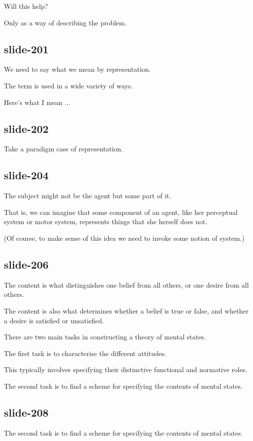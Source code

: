 \documentclass[12pt,\papersize]{extarticle}
\begin{document}
Will this help?
 
Only as a way of describing the problem.
 
\subsection{slide-201}
We need to say what we mean by representation.
 
The term is used in a wide variety of ways.
 
Here's what I mean ...
 
\subsection{slide-202}
Take a paradigm case of representation.
 
\subsection{slide-204}
The subject might not be the agent but some part of it.
 
That is, we can imagine that some component of an agent, like her perceptual system or motor system, represents things that she herself does not.
 
(Of course, to make sense of this idea we need to invoke some notion of system.)
 
\subsection{slide-206}
The content is what distinguishes one belief from all others, or one desire from all others.
 
The content is also what determines whether a belief is true or false, and whether a desire is satisfied or unsatisfied.
 
There are two main tasks in constructing a theory of mental states.
 
The first task is to characterise the different attitudes.
 
This typically involves specifying their distinctive functional and normative roles.
 
The second task is to find a scheme for specifying the contents of mental states.
 
\subsection{slide-208}
The second task is to find a scheme for specifying the contents of mental states.
 
\end{document}
